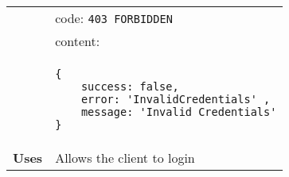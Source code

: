 \begin{adjustwidth}{1cm}{}
\begin{longtable}{|c|l|}
              & code: \texttt{403 FORBIDDEN} \\
            &                         content: \\
            & \begin{minipage}[t]{0.7\textwidth}
                \begin{adjustwidth}{1.5cm}{}
                \begin{verbatim}
{
    success: false, 
    error: 'InvalidCredentials' ,
    message: 'Invalid Credentials'
}
                \end{verbatim}
                \end{adjustwidth}
              \end{minipage} \\
              \hline
            \textbf{Uses} & Allows the client to login \\
            \hline
        \end{longtable}
    \end{adjustwidth}
    
